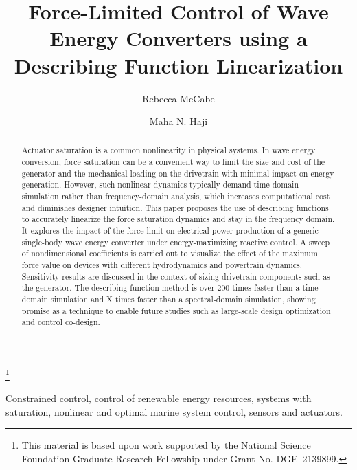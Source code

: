 \documentclass{ifacconf}
\begin{document}
\begin{frontmatter}

\title{Force-Limited Control of Wave Energy Converters using a Describing Function Linearization} 

\thanks[footnoteinfo]{This material is based upon work supported by the National Science Foundation Graduate Research Fellowship under Grant No. DGE–2139899.}

\author[First]{Rebecca McCabe} 
\author[Second]{Maha N. Haji} 

\address*{Sibley School of Mechanical and Aerospace Engineering, Cornell University, 
   Ithaca, NY 14853 USA }
   \address[First]{e-mail: rgm222@cornell.edu}
   \address[Second]{e-mail: maha@cornell.edu}

\begin{abstract}                %
Actuator saturation is a common nonlinearity in physical systems. In wave energy conversion, force saturation can be a convenient way to limit the size and cost of the generator and the mechanical loading on the drivetrain with minimal impact on energy generation. However, such nonlinear dynamics typically demand time-domain simulation rather than frequency-domain analysis, which increases computational cost and diminishes designer intuition. This paper proposes the use of describing functions to accurately linearize the force saturation dynamics and stay in the frequency domain. It explores the impact of the force limit on electrical power production of a generic single-body wave energy converter under energy-maximizing reactive control. A sweep of nondimensional coefficients is carried out to visualize the effect of the maximum force value on devices with different hydrodynamics and powertrain dynamics. Sensitivity results are discussed in the context of sizing drivetrain components such as the generator. The describing function method is over 200 times faster than a time-domain simulation and X times faster than a spectral-domain simulation, showing promise as a technique to enable future studies such as large-scale design optimization and control co-design.
\end{abstract}

\begin{keyword}
Constrained control, control of renewable energy resources, systems with saturation, nonlinear and optimal marine system control, sensors and actuators.
\end{keyword}

\end{frontmatter}
\end{document}
